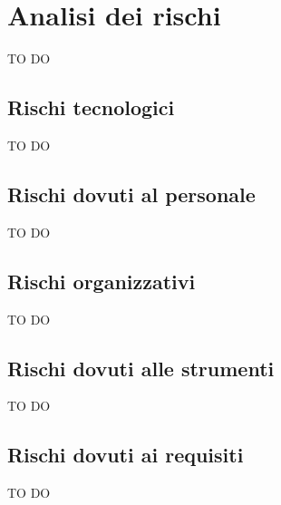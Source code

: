 % 
%


\section{Analisi dei rischi} %
\label{sec:analisi_dei_rischi}
TO DO
	\subsection{Rischi tecnologici} %
	\label{sub:rischi_tecnologici}
	TO DO
	
	\subsection{Rischi dovuti al personale} %
	\label{sub:rischi_dovuti_al_personale}
	TO DO
	
	\subsection{Rischi organizzativi} %
	\label{sub:rischi_organizzativi}
	TO DO
	
	\subsection{Rischi dovuti alle strumenti} %
	\label{sub:rischi_dovuti_alle_strumenti}
	TO DO
	
	\subsection{Rischi dovuti ai requisiti} %
	\label{sub:rischi_dovuti_ai_requisiti}
	TO DO
	

